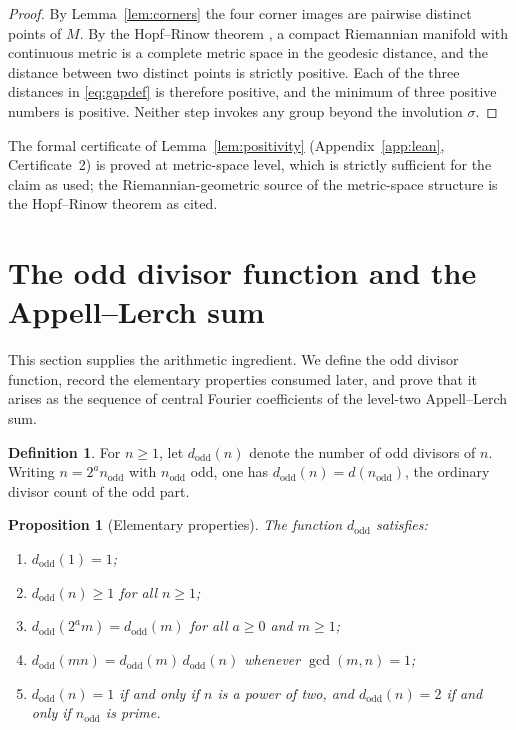 \documentclass[11pt,a4paper]{article}
\newcommand{\dodd}{d_{\mathrm{odd}}}
\theoremstyle{plain}
\newtheorem{proposition}[theorem]{Proposition}
\theoremstyle{definition}
\newtheorem{definition}[theorem]{Definition}
\theoremstyle{remark}
\begin{document}
\begin{proof}
By Lemma~\ref{lem:corners} the four corner images are pairwise
distinct points of $M$. By the Hopf--Rinow theorem
\cite[Ch.~7]{doCarmo}, a compact Riemannian manifold with continuous
metric is a complete metric space in the geodesic distance, and the
distance between two distinct points is strictly positive. Each of
the three distances in \eqref{eq:gapdef} is therefore positive, and
the minimum of three positive numbers is positive. Neither step
invokes any group beyond the involution $\sigma$.
\end{proof}

The formal certificate of Lemma~\ref{lem:positivity}
(Appendix~\ref{app:lean}, Certificate~2) is proved at metric-space
level, which is strictly sufficient for the claim as used; the
Riemannian-geometric source of the metric-space structure is the
Hopf--Rinow theorem as cited.

\section{The odd divisor function and the Appell--Lerch sum}\label{sec:arithmetic}

This section supplies the arithmetic ingredient. We define the odd
divisor function, record the elementary properties consumed later, and
prove that it arises as the sequence of central Fourier coefficients
of the level-two Appell--Lerch sum.

\begin{definition}\label{def:dodd}
For $n \ge 1$, let $\dodd(n)$ denote the number of odd divisors of
$n$. Writing $n = 2^a n_{\mathrm{odd}}$ with $n_{\mathrm{odd}}$ odd,
one has $\dodd(n) = d(n_{\mathrm{odd}})$, the ordinary divisor count
of the odd part.
\end{definition}

\begin{proposition}[Elementary properties]\label{prop:doddprops}
The function $\dodd$ satisfies:
\begin{enumerate}[label=\textup{(\roman*)}]
\item $\dodd(1) = 1$;
\item $\dodd(n) \ge 1$ for all $n \ge 1$;
\item $\dodd(2^a m) = \dodd(m)$ for all $a \ge 0$ and $m \ge 1$;
\item $\dodd(mn) = \dodd(m)\,\dodd(n)$ whenever $\gcd(m,n) = 1$;
\item $\dodd(n) = 1$ if and only if $n$ is a power of two, and
  $\dodd(n) = 2$ if and only if $n_{\mathrm{odd}}$ is prime.
\end{enumerate}
\end{proposition}
\end{document}
